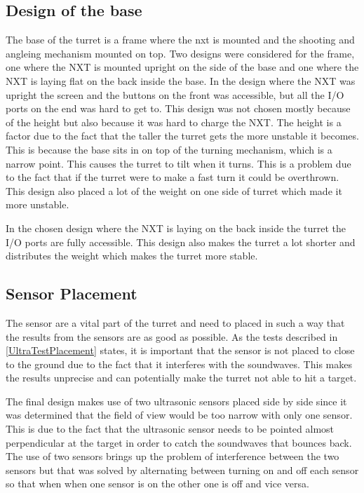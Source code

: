 \subsection{Design of the base}
The base of the turret is a frame where the nxt is mounted and the shooting and
angleing mechanism mounted on top. Two designs were considered for the frame,
one where the NXT is mounted upright on the side of the base and one where the
NXT is laying flat on the back inside the base. In the design where the NXT was
upright the screen and the buttons on the front was accessible, but all the I/O
ports on the end was hard to get to. This design was not chosen mostly because
of the height but also because it was hard to charge the NXT. The height is a
factor due to the fact that the taller the turret gets the more unstable it
becomes. This is because the base sits in on top of the turning mechanism, which
is a narrow point. This causes the turret to tilt when it turns. This is a
problem due to the fact that if the turret were to make a fast turn it could be
overthrown. 
This design also placed a lot of the weight on one side of turret which made it
more unstable.\nl

In the chosen design where the NXT is laying on the back inside the turret the
I/O ports are fully accessible. This design also makes the turret a lot shorter
and distributes the weight which makes the turret more stable. 

\subsection{Sensor Placement}
The sensor are a vital part of the turret and need to placed in such a way that
the results from the sensors are as good as possible. As the tests described in
\autoref{UltraTestPlacement} states, it is important that the sensor is not
placed to close to the ground due to the fact that it interferes with the
soundwaves. This makes the results unprecise and can potentially make the
turret not able to hit a target.\nl

The final design makes use of two ultrasonic sensors placed side by side since
it was determined that the field of view would be too narrow with only one
sensor. This is due to the fact that the ultrasonic sensor needs to be pointed
almost perpendicular at the target in order to catch the soundwaves that bounces
back. The use of two sensors brings up the problem of interference between the
two sensors but that was solved by alternating between turning on and off each
sensor so that when when one sensor is on the other one is off and vice
versa.\nl

